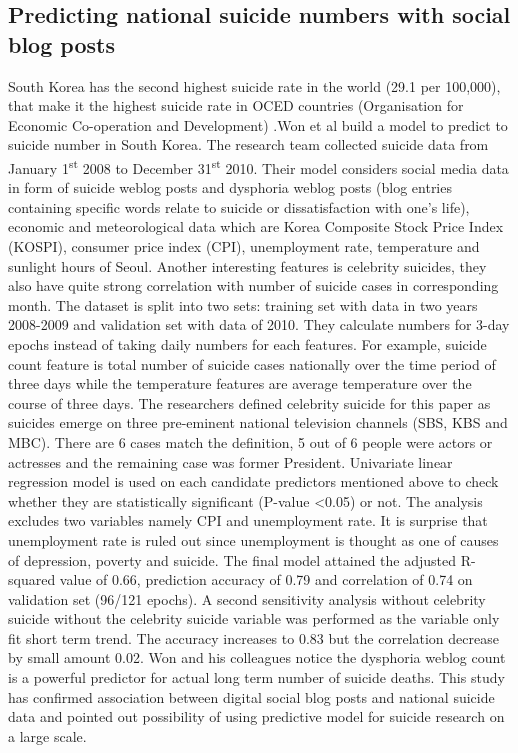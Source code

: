 \subsection{Predicting national suicide numbers with social blog posts}
South Korea has the second highest suicide rate in the world (29.1 per 100,000), that make it the highest suicide rate in OCED countries (Organisation for Economic Co-operation and Development) \cite{Yoon2015}.Won et al \cite{Won2013} build a model to predict to suicide number in South Korea. The research team collected suicide data from January 1\textsuperscript{st} 2008 to December 31\textsuperscript{st} 2010. Their model considers social media data in form of suicide weblog posts and dysphoria weblog posts (blog entries containing specific words relate to suicide or dissatisfaction with one’s life), economic and meteorological data which are Korea Composite Stock Price Index (KOSPI), consumer price index (CPI), unemployment rate, temperature and sunlight hours of Seoul. Another interesting features is celebrity suicides, they also have quite strong correlation with number of suicide cases in corresponding month. The dataset is split into two sets: training set with data in two years 2008-2009 and validation set with data of 2010. They calculate numbers for 3-day epochs instead of taking daily numbers for each features. For example, suicide count feature is total number of suicide cases nationally over the time period of three days while the temperature features are average temperature over the course of three days. The researchers defined celebrity suicide for this paper as suicides emerge on three pre-eminent national television channels (SBS, KBS and MBC). There are 6 cases match the definition, 5 out of 6 people were actors or actresses and the remaining case was former President. Univariate linear regression model is used on each candidate predictors mentioned above to check whether they are statistically significant (P-value \textless  0.05) or not. The analysis excludes two variables namely CPI and unemployment rate. It is surprise that unemployment rate is ruled out since unemployment is thought as one of causes of depression, poverty and suicide. The final model attained the adjusted R-squared value of 0.66, prediction accuracy of 0.79 and correlation of 0.74 on validation set (96/121 epochs). A second sensitivity analysis without celebrity suicide without the celebrity suicide variable was performed as the variable only fit short term trend. The accuracy increases to 0.83 but the correlation decrease by small amount 0.02. Won and his colleagues notice the dysphoria weblog count is a powerful predictor for actual long term number of suicide deaths. This study has confirmed association between digital social blog posts and national suicide data and pointed out possibility of using predictive model for suicide research on a large scale. \\


